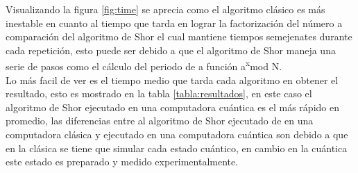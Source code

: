 Visualizando la figura \ref{fig:time} se aprecia como el algoritmo clásico es más inestable en cuanto al tiempo que tarda en lograr la factorización del número
a comparación del algoritmo de Shor el cual mantiene tiempos semejenates durante cada repetición, esto puede ser debido a que el algoritmo de Shor maneja una serie 
de pasos como el cálculo del periodo de a función a\textsuperscript{x}mod N.\\
Lo más facil de ver es el tiempo medio que tarda cada algoritmo en obtener el resultado, esto es mostrado en la tabla \ref{tabla:resultados}, en este caso el algoritmo de Shor
ejecutado en una computadora cuántica es el más rápido en promedio, las diferencias entre al algoritmo de Shor ejecutado de en una computadora clásica y ejecutado en una computadora
cuántica son debido a que en la clásica se tiene que simular cada estado cuántico, en cambio en la cuántica este estado es preparado y medido experimentalmente.\\\\

